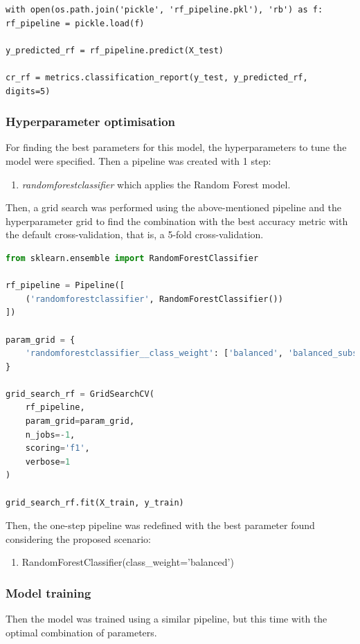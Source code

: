 \documentclass{article}
\begin{document}
\begin{lstlisting}
with open(os.path.join('pickle', 'rf_pipeline.pkl'), 'rb') as f:    
rf_pipeline = pickle.load(f)
    
y_predicted_rf = rf_pipeline.predict(X_test)

cr_rf = metrics.classification_report(y_test, y_predicted_rf, digits=5)
\end{lstlisting}

\subsubsection{Hyperparameter optimisation}
For finding the best parameters for this model, the hyperparameters to tune the model were specified. Then a pipeline was created with 1 step:
\begin{enumerate}
\item \emph{randomforestclassifier} which applies the Random Forest model.
\end{enumerate}

Then, a grid search was performed using the above-mentioned pipeline and the hyperparameter grid to find the combination with the best accuracy metric with the default cross-validation, that is, a 5-fold cross-validation.
\begin{lstlisting}[language=Python]
from sklearn.ensemble import RandomForestClassifier

rf_pipeline = Pipeline([
    ('randomforestclassifier', RandomForestClassifier())
])

param_grid = {
    'randomforestclassifier__class_weight': ['balanced', 'balanced_subsample']
}

grid_search_rf = GridSearchCV(
    rf_pipeline,
    param_grid=param_grid,
    n_jobs=-1,
    scoring='f1',
    verbose=1
)

grid_search_rf.fit(X_train, y_train)
\end{lstlisting}

Then, the one-step pipeline was redefined with the best parameter found considering the proposed scenario:
\begin{enumerate}    
    \item RandomForestClassifier(class\_weight='balanced')
\end{enumerate}

\subsubsection{Model training}
Then the model was trained using a similar pipeline, but this time with the optimal combination of parameters.
\end{document}

